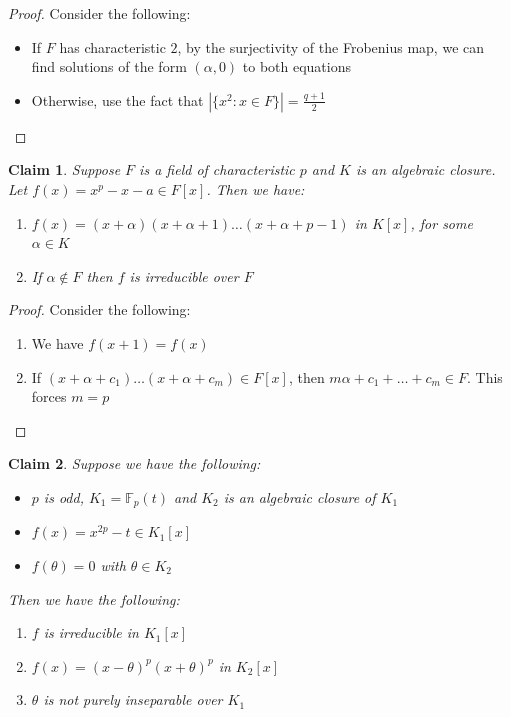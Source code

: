 \documentclass[a4paper,11pt]{article}
\newtheorem{claim}{Claim}
\begin{document}
\begin{proof}
  Consider the following:
  \begin{itemize}
    \item If $F$ has characteristic $2$, by the surjectivity of the Frobenius map, we can find solutions of the form $(\alpha,0)$ to both equations
    \item Otherwise, use the fact that $|\{x^2:x \in F\}|=\frac{q+1}{2}$
  \end{itemize}
  
\end{proof}

\begin{claim}
  Suppose $F$ is a field of characteristic $p$ and $K$ is an algebraic closure. Let $f(x)=x^p-x-a \in F[x]$. Then we have:
  \begin{enumerate}
    \item $f(x)=(x+\alpha)(x+\alpha+1)\dots(x+\alpha+p-1)$ in $K[x]$, for some $\alpha \in K$
    \item If $\alpha \notin F$ then $f$ is irreducible over $F$
  \end{enumerate} 
\end{claim}

\begin{proof}
  Consider the following:
  \begin{enumerate}
    \item We have $f(x+1)=f(x)$
    \item If $(x+\alpha + c_1)\dots(x+\alpha + c_m) \in F[x]$, then $m\alpha + c_1 + \dots + c_m \in F$. This forces $m=p$ 
  \end{enumerate}
\end{proof}

\begin{claim}
  Suppose we have the following:
  \begin{itemize}
    \item $p$ is odd, $K_1=\mathbb{F}_p(t)$ and $K_2$ is an algebraic closure of $K_1$
    \item $f(x)=x^{2p}-t \in K_1[x]$
    \item $f(\theta)=0$ with $\theta \in K_2$
  \end{itemize}
  
  Then we have the following:
  \begin{enumerate}
    \item $f$ is irreducible in $K_1[x]$
    \item $f(x)=(x-\theta)^p(x+\theta)^p$ in $K_2[x]$
    \item $\theta$ is not purely inseparable over $K_1$
  \end{enumerate}
\end{claim}
\end{document}
